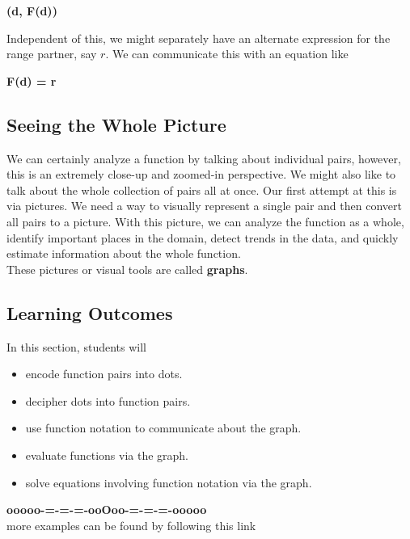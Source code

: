 \documentclass{ximera}
\begin{document}
\begin{center}
\textbf{\textcolor{purple!85!blue}{(d, F(d))}}
\end{center}




Independent of this, we might separately have an alternate expression for the range partner, say $r$.  We can communicate this with an equation like




\begin{center}
\textbf{\textcolor{purple!85!blue}{F(d) = r}}
\end{center}


\subsection*{Seeing the Whole Picture}

We can certainly analyze a function by talking about individual pairs, however, this is an extremely close-up and zoomed-in perspective. We might also like to talk about the whole collection of pairs all at once.  Our first attempt at this is via pictures. We need a way to visually represent a single pair and then convert all pairs to a picture.  With this picture, we can analyze the function as a whole, identify important places in the domain, detect trends in the data, and quickly estimate information about the whole function. \\

These pictures or visual tools are called \textbf{\textcolor{blue!55!black}{graphs}}. \\






\subsection*{Learning Outcomes}

\begin{sectionOutcomes}
In this section, students will 

\begin{itemize}
\item encode function pairs into dots.
\item decipher dots into function pairs.
\item use function notation to communicate about the graph.
\item evaluate functions via the graph.
\item solve equations involving function notation via the graph.
\end{itemize}
\end{sectionOutcomes}











\begin{center}
\textbf{\textcolor{green!50!black}{ooooo-=-=-=-ooOoo-=-=-=-ooooo}} \\

more examples can be found by following this link\\ 

\end{center}
\end{document}
